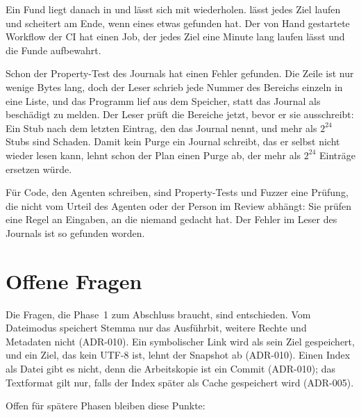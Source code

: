 {Ein Fund liegt danach in  und lässt sich mit
 wiederholen.  lässt jedes Ziel
laufen und scheitert am Ende, wenn eines etwas gefunden hat. Der von Hand gestartete Workflow
der CI hat einen Job, der jedes Ziel eine Minute lang laufen lässt und die Funde aufbewahrt.

Schon der Property-Test des Journals hat einen Fehler gefunden. Die Zeile
 ist nur wenige Bytes lang, doch der Leser schrieb jede Nummer des
Bereichs einzeln in eine Liste, und das Programm lief aus dem Speicher, statt das Journal als
beschädigt zu melden. Der Leser prüft die Bereiche jetzt, bevor er sie ausschreibt: Ein Stub
nach dem letzten Eintrag, den das Journal nennt, und mehr als $2^{24}$ Stubs sind Schaden.
Damit kein Purge ein Journal schreibt, das er selbst nicht wieder lesen kann, lehnt schon der
Plan einen Purge ab, der mehr als $2^{24}$ Einträge ersetzen würde.

Für Code, den Agenten schreiben, sind Property-Tests und Fuzzer eine Prüfung,
die nicht vom Urteil des Agenten oder der Person im Review abhängt:
Sie prüfen eine Regel an Eingaben, an die niemand gedacht hat.
Der Fehler im Leser des Journals ist so gefunden worden.

\section{Offene Fragen}

Die Fragen, die Phase~1 zum Abschluss braucht, sind entschieden.
Vom Dateimodus speichert Stemma nur das Ausführbit, weitere Rechte und Metadaten nicht
(ADR-010). Ein symbolischer Link wird als sein Ziel gespeichert,
und ein Ziel, das kein UTF-8 ist, lehnt der Snapshot ab (ADR-010).
Einen Index als Datei gibt es nicht, denn die Arbeitskopie ist ein Commit (ADR-010);
das Textformat  gilt nur, falls der Index später als Cache gespeichert
wird (ADR-005).

Offen für spätere Phasen bleiben diese Punkte:

}
